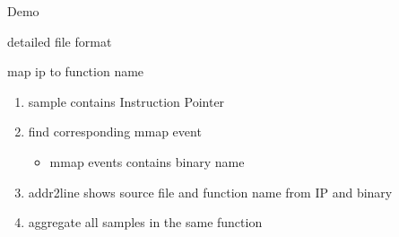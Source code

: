 \begin{frame}{Demo}
\end{frame}

\begin{frame}{detailed file format\label{sec:fileformat}}
\end{frame}

\begin{frame}{map ip to function name}
\begin{enumerate}
  \item sample contains Instruction Pointer
  \item find corresponding mmap event
  \begin{itemize}
    \item mmap events contains binary name
  \end{itemize}
  \item addr2line shows source file and function name from IP and binary
  \item aggregate all samples in the same function
\end{enumerate}
\end{frame}

